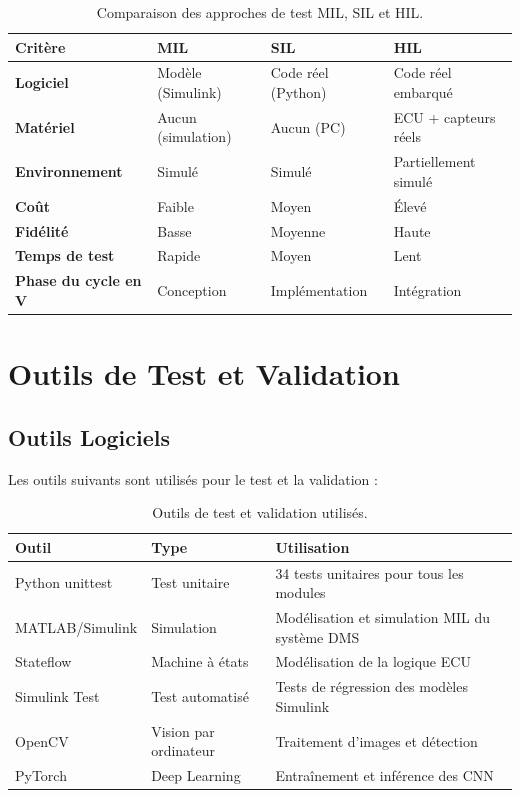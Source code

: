 \documentclass[12pt,a4paper,twoside]{report}
\begin{document}
\begin{table}[H]
\centering
\caption{Comparaison des approches de test MIL, SIL et HIL.}
\label{tab:mil_sil_hil}
\renewcommand{\arraystretch}{1.4}
\begin{tabularx}{\textwidth}{|>{\bfseries}l|X|X|X|}
\hline
\rowcolor{stellantisblue!15}
\textbf{Critère} & \textbf{MIL} & \textbf{SIL} & \textbf{HIL} \\
\hline
Logiciel & Modèle (Simulink) & Code réel (Python) & Code réel embarqué \\
\hline
Matériel & Aucun (simulation) & Aucun (PC) & ECU + capteurs réels \\
\hline
Environnement & Simulé & Simulé & Partiellement simulé \\
\hline
Coût & Faible & Moyen & Élevé \\
\hline
Fidélité & Basse & Moyenne & Haute \\
\hline
Temps de test & Rapide & Moyen & Lent \\
\hline
Phase du cycle en V & Conception & Implémentation & Intégration \\
\hline
\end{tabularx}
\end{table}

\section{Outils de Test et Validation}

\subsection{Outils Logiciels}

Les outils suivants sont utilisés pour le test et la validation :

\begin{table}[H]
\centering
\caption{Outils de test et validation utilisés.}
\label{tab:outils_test}
\renewcommand{\arraystretch}{1.3}
\begin{tabularx}{\textwidth}{|l|l|X|}
\hline
\rowcolor{stellantisblue!15}
\textbf{Outil} & \textbf{Type} & \textbf{Utilisation} \\
\hline
Python unittest & Test unitaire & 34 tests unitaires pour tous les modules \\
\hline
MATLAB/Simulink & Simulation & Modélisation et simulation MIL du système DMS \\
\hline
Stateflow & Machine à états & Modélisation de la logique ECU \\
\hline
Simulink Test & Test automatisé & Tests de régression des modèles Simulink \\
\hline
OpenCV & Vision par ordinateur & Traitement d'images et détection \\
\hline
PyTorch & Deep Learning & Entraînement et inférence des CNN \\
\hline
\end{tabularx}
\end{table}
\end{document}
